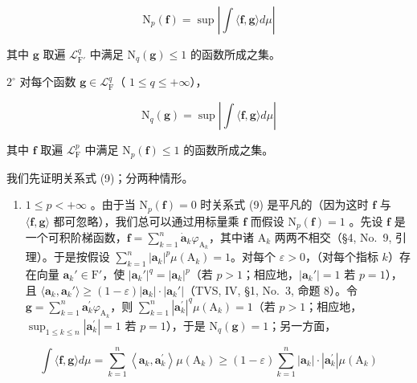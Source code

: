 \[
\mathrm{N} _ {p} (\mathbf {f}) = \sup \left| \int \langle \mathbf {f}, \mathbf {g} \rangle d \mu \right|\tag{9}
\]

其中 \(\mathbf{g}\) 取遍 \(\mathcal{L}_{\mathrm{F}'}^q\) 中满足 \(\mathrm{N}_q(\mathbf{g}) \leqslant 1\) 的函数所成之集。

\(2^{\circ}\) 对每个函数 \(\mathbf{g} \in \mathcal{L}_{\mathrm{F}}^{q}\)（ \(1 \leqslant q \leqslant +\infty\)），

\[
\mathrm{N} _ {q} (\mathbf {g}) = \sup \left| \int \langle \mathbf {f}, \mathbf {g} \rangle d \mu \right|\tag{10}
\]

其中 \(\mathbf{f}\) 取遍 \(\mathcal{L}_{\mathrm{F}}^{p}\) 中满足 \(\mathrm{N}_p(\mathbf{f})\leqslant 1\) 的函数所成之集。

我们先证明关系式 (9)；分两种情形。

\begin{enumerate}
\def\labelenumi{(\roman{enumi})}
\tightlist
\item
  \(1 \leqslant p < +\infty\) 。由于当 \(\mathrm{N}_p(\mathbf{f}) = 0\) 时关系式 (9) 是平凡的（因为这时 \(\mathbf{f}\) 与 \(\langle \mathbf{f}, \mathbf{g} \rangle\) 都可忽略），我们总可以通过用标量乘 \(\mathbf{f}\) 而假设 \(\mathrm{N}_p(\mathbf{f}) = 1\) 。先设 \(\mathbf{f}\) 是一个可积阶梯函数，\(\mathbf{f} = \sum_{k=1}^{n} \dot{\mathbf{a}}_k \varphi_{\mathrm{A}_k}\)，其中诸 \(\mathrm{A}_k\) 两两不相交（§4, No.~9, 引理）。于是按假设 \(\sum_{k=1}^{n} |\mathbf{a}_k|^p \mu(\mathrm{A}_k) = 1\)。对每个 \(\varepsilon > 0\)，（对每个指标 \(k\)）存在向量 \(\mathbf{a}_k' \in \mathrm{F}'\)，使 \(|\mathbf{a}_k'|^q = |\mathbf{a}_k|^p\)（若 \(p > 1\)；相应地，\(|\mathbf{a}_k'| = 1\) 若 \(p = 1\)），且 \(\langle \mathbf{a}_k, \mathbf{a}_k' \rangle \geqslant (1 - \varepsilon) |\mathbf{a}_k| \cdot |\mathbf{a}_k'|\)（TVS, IV, §1, No.~3, 命题 8）。令 \(\mathbf{g} = \sum_{k=1}^{n} \mathbf{a}_{k}^{\prime} \varphi_{\mathrm{A}_{k}}\)，则 \(\sum_{k=1}^{n} |\mathbf{a}_{k}^{\prime}|^{q} \mu(\mathrm{A}_{k}) = 1\)（若 \(p > 1\)；相应地，\(\sup_{1 \leqslant k \leqslant n} |\mathbf{a}_{k}^{\prime}| = 1\) 若 \(p = 1\)），于是 \(\mathrm{N}_{q}(\mathbf{g}) = 1\)；另一方面，
\end{enumerate}

\[
\int \langle \mathbf {f}, \mathbf {g} \rangle d \mu = \sum_ {k = 1} ^ {n} \left\langle \mathbf {a} _ {k}, \mathbf {a} _ {k} ^ {\prime} \right\rangle \mu \left(\mathrm{A} _ {k}\right) \geqslant (1 - \varepsilon) \sum_ {k = 1} ^ {n} | \mathbf {a} _ {k} | \cdot | \mathbf {a} _ {k} ^ {\prime} | \mu (\mathrm{A} _ {k})
\]

